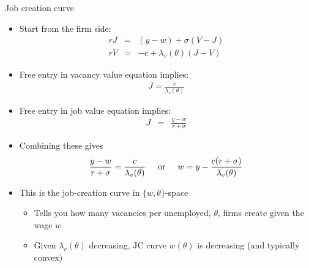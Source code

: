\documentclass[9pt]{beamer}
\newcommand{\bit}{\begin{itemize}}
\newcommand{\eit}{\end{itemize}}
\newcommand{\bc}{\color{blue}}
\begin{document}
\begin{frame}{Job creation curve}

\bit
\setlength\itemsep{1em}

\item Start from the firm side:
\begin{eqnarray}
rJ &=& (y-w)  + \sigma \left(V-J\right) \nonumber \\ 
rV &=& -c  + \lambda_v(\theta) \left(J-V\right) \nonumber
\end{eqnarray}

\item Free entry in vacancy value equation implies:
\begin{eqnarray}
J = \frac{c}{\lambda_v(\theta)} \nonumber
\end{eqnarray}



\item Free entry in job value equation implies:
\begin{eqnarray}
J &=& \frac{y-w}{r+\sigma} \nonumber
\end{eqnarray}

\item Combining these gives
\begin{eqnarray}
\frac{y-w}{r+\sigma} = \frac{c}{\lambda_v(\theta)} \nonumber \hspace{5mm} \text{or} \hspace{5mm} w = y - \frac{c(r+\sigma)}{\lambda_v(\theta)}
\end{eqnarray}

\item This is the {\bc job-creation curve} \normalfont in $\{w,\theta\}$-space
\bit
	\item Tells you how many vacancies per unemployed, $\theta$, firms create given the wage $w$ 
	\item Given $\lambda_v(\theta)$ decreasing, JC curve $w(\theta)$ is decreasing (and typically convex)
\eit

\eit
\end{frame}
\end{document}
